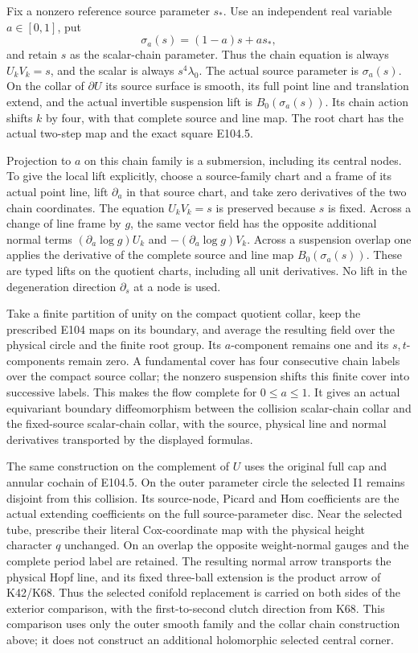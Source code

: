 Fix a nonzero reference source parameter \(s_*\). Use an independent real variable \(a\in[0,1]\), put
\[
                         \sigma_a(s)=(1-a)s+a s_*,
 \tag{E105.2}
\]
and retain \(s\) as the scalar-chain parameter. Thus the chain equation is always \(U_kV_k=s\), and the scalar is always \(s^4\lambda_0\). The actual source parameter is \(\sigma_a(s)\). On the collar of \(\partial U\) its source surface is smooth, its full point line and translation extend, and the actual invertible suspension lift is \(B_0(\sigma_a(s))\). Its chain action shifts \(k\) by four, with that complete source and line map. The root chart has the actual two-step map and the exact square E104.5.

Projection to \(a\) on this chain family is a submersion, including its central nodes. To give the local lift explicitly, choose a source-family chart and a frame of its actual point line, lift \(\partial_a\) in that source chart, and take zero derivatives of the two chain coordinates. The equation \(U_kV_k=s\) is preserved because \(s\) is fixed. Across a change of line frame by \(g\), the same vector field has the opposite additional normal terms \((\partial_a\log g)U_k\) and \(- (\partial_a\log g)V_k\). Across a suspension overlap one applies the derivative of the complete source and line map \(B_0(\sigma_a(s))\). These are typed lifts on the quotient charts, including all unit derivatives. No lift in the degeneration direction \(\partial_s\) at a node is used.

Take a finite partition of unity on the compact quotient collar, keep the prescribed E104 maps on its boundary, and average the resulting field over the physical circle and the finite root group. Its \(a\)-component remains one and its \(s,t\)-components remain zero. A fundamental cover has four consecutive chain labels over the compact source collar; the nonzero suspension shifts this finite cover into successive labels. This makes the flow complete for \(0\leq a\leq1\). It gives an actual equivariant boundary diffeomorphism between the collision scalar-chain collar and the fixed-source scalar-chain collar, with the source, physical line and normal derivatives transported by the displayed formulas.

The same construction on the complement of \(U\) uses the original full cap and annular cochain of E104.5. On the outer parameter circle the selected I1 remains disjoint from this collision. Its source-node, Picard and Hom coefficients are the actual extending coefficients on the full source-parameter disc. Near the selected tube, prescribe their literal Cox-coordinate map with the physical height character \(q\) unchanged. On an overlap the opposite weight-normal gauges and the complete period label are retained. The resulting normal arrow transports the physical Hopf line, and its fixed three-ball extension is the product arrow of K42/K68. Thus the selected conifold replacement is carried on both sides of the exterior comparison, with the first-to-second clutch direction from K68. This comparison uses only the outer smooth family and the collar chain construction above; it does not construct an additional holomorphic selected central corner.

